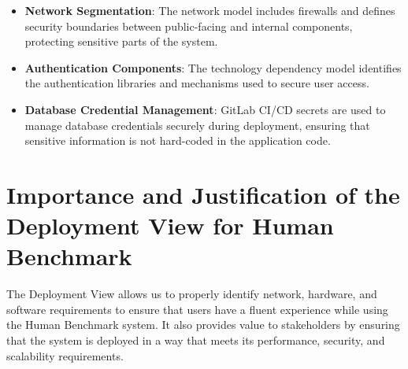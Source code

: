 \begin{itemize}
    \item \textbf{Network Segmentation}: The network model includes firewalls and defines security boundaries between public-facing and internal components, protecting sensitive parts of the system.

    \item \textbf{Authentication Components}: The technology dependency model identifies the authentication libraries and mechanisms used to secure user access.
    
    \item \textbf{Database Credential Management}: GitLab CI/CD secrets are used to manage database credentials securely during deployment, ensuring that sensitive information is not hard-coded in the application code.



\end{itemize}

\section{Importance and Justification of the Deployment View for Human Benchmark}

The Deployment View allows us to properly identify network, hardware, and software requirements to ensure
that users have a fluent experience while using the Human Benchmark system. It also provides value to stakeholders by
ensuring that the system is deployed in a way that meets its performance, security, and scalability requirements.


